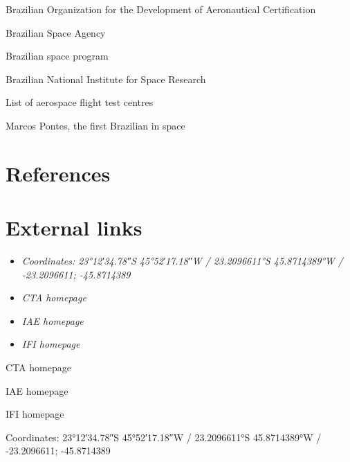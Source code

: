 Brazilian Organization for the Development of Aeronautical Certification

Brazilian Space Agency

Brazilian space program

Brazilian National Institute for Space Research

List of aerospace flight test centres

Marcos Pontes, the first Brazilian in space

\section{References}\label{references}

\section{External links}\label{external-links}

\begin{itemize}
\item
  \emph{Coordinates: 23°12′34.78″S 45°52′17.18″W﻿ / ﻿23.2096611°S
  45.8714389°W﻿ / -23.2096611; -45.8714389}
\item
  \emph{CTA homepage}
\item
  \emph{IAE homepage}
\item
  \emph{IFI homepage}
\end{itemize}

CTA homepage

IAE homepage

IFI homepage

Coordinates: 23°12′34.78″S 45°52′17.18″W﻿ / ﻿23.2096611°S 45.8714389°W﻿
/ -23.2096611; -45.8714389
